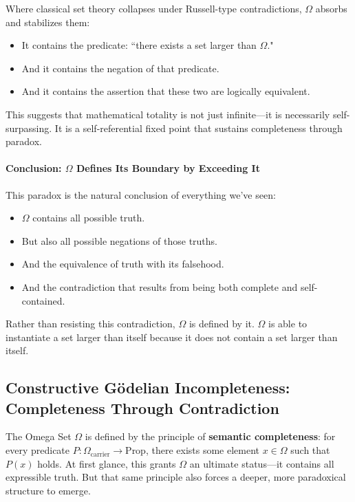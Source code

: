 \documentclass[12pt]{article}
\begin{document}
Where classical set theory collapses under Russell-type contradictions, \( \Omega \) absorbs and stabilizes them:
\begin{itemize}
    \item It contains the predicate: ``there exists a set larger than \( \Omega \)."
    \item And it contains the negation of that predicate.
    \item And it contains the assertion that these two are logically equivalent.
\end{itemize}

This suggests that mathematical totality is not just infinite—it is necessarily self-surpassing. It is a self-referential fixed point that sustains completeness through paradox.

\paragraph{Conclusion: \( \Omega \) Defines Its Boundary by Exceeding It}

This paradox is the natural conclusion of everything we've seen:

\begin{itemize}
\item \( \Omega \) contains all possible truth.
\item But also all possible negations of those truths.
\item And the equivalence of truth with its falsehood.
\item And the contradiction that results from being both complete and self-contained.
\end{itemize}

Rather than resisting this contradiction, \( \Omega \) is defined by it. \( \Omega \) is able to instantiate a set larger than itself because it does not contain a set larger than itself.


\subsection{Constructive Gödelian Incompleteness: Completeness Through Contradiction}

The Omega Set \( \Omega \) is defined by the principle of \textbf{semantic completeness}:
for every predicate \( P : \Omega_{\text{carrier}} \to \text{Prop} \), there exists some element \( x \in \Omega \) such that \( P(x) \) holds. At first glance, this grants \( \Omega \) an ultimate status—it contains all expressible truth. But that same principle also forces a deeper, more paradoxical structure to emerge.
\end{document}

